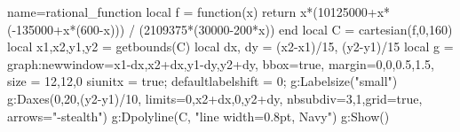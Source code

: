 \documentclass{standalone}%
\begin{document}
\begin{luadraw}{name=rational_function}
local f = function(x) return x*(10125000+x*(-135000+x*(600-x))) / (2109375*(30000-200*x)) end
local C = cartesian(f,0,160)
local x1,x2,y1,y2 = getbounds(C)
local dx, dy = (x2-x1)/15, (y2-y1)/15
local g = graph:new{window={x1-dx,x2+dx,y1-dy,y2+dy}, bbox=true, margin={0,0,0.5,1.5}, size = {12,12,0}}
siunitx = true; defaultlabelshift = 0; g:Labelsize("small")
g:Daxes({0,20,(y2-y1)/10}, {limits={{0,x2+dx},{0,y2+dy}}, nbsubdiv={3,1},grid=true, arrows="-stealth"})
g:Dpolyline(C, "line width=0.8pt, Navy")
g:Show()
\end{luadraw}
\end{document}
